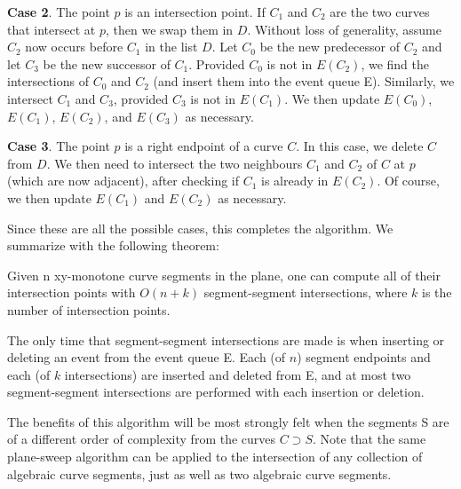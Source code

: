{\bf Case 2}. The point $p$ is an intersection point.
If $C_{1}$ and $C_{2}$ are the two curves that intersect at $p$, then we swap them
in $D$.  Without loss of generality, assume $C_{2}$ now occurs before $C_{1}$ in the
list $D$.  Let $C_{0}$ be the new predecessor of $C_{2}$ and let $C_{3}$ be the 
new successor of $C_{1}$.
Provided $C_{0}$ is not in $E(C_{2})$, we find the intersections of $C_{0}$ and $C_{2}$
(and insert them into the event queue E).
Similarly, we intersect $C_{1}$ and $C_{3}$, provided $C_{3}$ is not in $E(C_{1})$. 
We then update $E(C_{0})$, $E(C_{1})$, $E(C_{2})$, and $E(C_{3})$ as necessary.

{\bf Case 3}.  The point $p$ is a right endpoint of a curve $C$.
In this case, we delete $C$ from $D$.
We then need to intersect the two neighbours $C_{1}$ and $C_{2}$ of $C$ at $p$
(which are now adjacent), after checking if $C_{1}$ is already in $E(C_{2})$.
Of course, we then update $E(C_{1})$ and  $E(C_{2})$ as necessary.

Since these are all the possible cases, this completes the algorithm.
We summarize with the following theorem:
\begin{theorem}
Given n xy-monotone curve segments in the plane, one can compute all of their 
intersection points with $O(n+k)$ segment-segment intersections, 
where $k$ is the number of intersection points.
\end{theorem}
The only time that segment-segment intersections are made is when inserting or deleting an
event from the event queue E.
Each (of $n$) segment endpoints and each (of $k$ intersections) are inserted and deleted from E,
and at most two segment-segment intersections are performed with each insertion or deletion.
\QED

The benefits of this algorithm will be most strongly felt when the segments S are of 
a different order of complexity from the curves $C \supset S$.
Note that the same plane-sweep algorithm can be applied to the intersection of any 
collection of algebraic curve segments, just as well as two algebraic curve segments.


